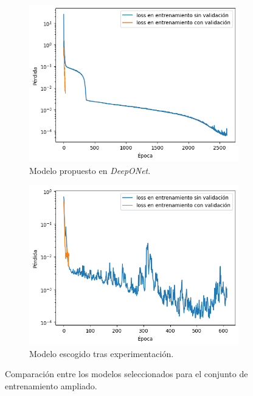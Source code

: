 \begin{figure}[htbp]
    \centering
    \begin{subfigure}{0.45\textwidth}
    \centering
    \includegraphics[width=\linewidth]{img/img63.png} 
    \caption{Modelo propuesto en \textit{DeepONet}.}
    \label{fig:img63}
    \end{subfigure}   
    \begin{subfigure}{0.45\textwidth}
    \centering
    \includegraphics[width=\linewidth]{img/img65.png}
    \caption{Modelo escogido tras experimentación.}
    \label{fig:img65}
    \end{subfigure}
\caption{Comparación entre los modelos seleccionados para el conjunto de entrenamiento ampliado.}
\label{fig:img6365}
\end{figure}


